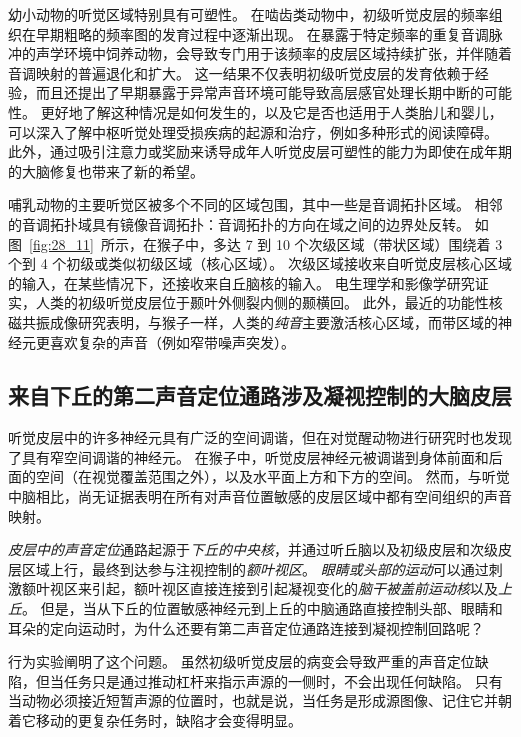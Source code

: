 幼小动物的听觉区域特别具有可塑性。
在啮齿类动物中，初级听觉皮层的频率组织在早期粗略的频率图的发育过程中逐渐出现。
在暴露于特定频率的重复音调脉冲的声学环境中饲养动物，会导致专门用于该频率的皮层区域持续扩张，并伴随着音调映射的普遍退化和扩大。
这一结果不仅表明初级听觉皮层的发育依赖于经验，而且还提出了早期暴露于异常声音环境可能导致高层感官处理长期中断的可能性。
更好地了解这种情况是如何发生的，以及它是否也适用于人类胎儿和婴儿，可以深入了解中枢听觉处理受损疾病的起源和治疗，例如多种形式的阅读障碍。
此外，通过吸引注意力或奖励来诱导成年人听觉皮层可塑性的能力为即使在成年期的大脑修复也带来了新的希望。


哺乳动物的主要听觉区被多个不同的区域包围，其中一些是音调拓扑区域。
相邻的音调拓扑域具有镜像音调拓扑：音调拓扑的方向在域之间的边界处反转。
如图~\ref{fig:28_11}~所示，在猴子中，多达 7 到 10 个次级区域（带状区域）围绕着 3 个到 4 个初级或类似初级区域（核心区域）。
次级区域接收来自听觉皮层核心区域的输入，在某些情况下，还接收来自丘脑核的输入。
电生理学和影像学研究证实，人类的初级听觉皮层位于颞叶外侧裂内侧的颞横回。
此外，最近的功能性核磁共振成像研究表明，与猴子一样，人类的\textit{纯音}主要激活核心区域，而带区域的神经元更喜欢复杂的声音（例如窄带噪声突发）。



\subsection{来自下丘的第二声音定位通路涉及凝视控制的大脑皮层}

听觉皮层中的许多神经元具有广泛的空间调谐，但在对觉醒动物进行研究时也发现了具有窄空间调谐的神经元。
在猴子中，听觉皮层神经元被调谐到身体前面和后面的空间（在视觉覆盖范围之外），以及水平面上方和下方的空间。
然而，与听觉中脑相比，尚无证据表明在所有对声音位置敏感的皮层区域中都有空间组织的声音映射。


\textit{皮层中的声音定位}通路起源于\textit{下丘的中央核}，并通过听丘脑以及初级皮层和次级皮层区域上行，最终到达参与注视控制的\textit{额叶视区}。
\textit{眼睛或头部的运动}可以通过刺激额叶视区来引起，额叶视区直接连接到引起凝视变化的\textit{脑干被盖前运动核}以及\textit{上丘}。
但是，当从下丘的位置敏感神经元到上丘的中脑通路直接控制头部、眼睛和耳朵的定向运动时，为什么还要有第二声音定位通路连接到凝视控制回路呢？


行为实验阐明了这个问题。
虽然初级听觉皮层的病变会导致严重的声音定位缺陷，但当任务只是通过推动杠杆来指示声源的一侧时，不会出现任何缺陷。
只有当动物必须接近短暂声源的位置时，也就是说，当任务是形成源图像、记住它并朝着它移动的更复杂任务时，缺陷才会变得明显。




